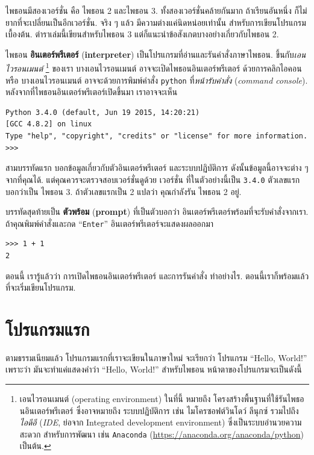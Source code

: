 ไพธอนมีสองเวอร์ชั่น คือ ไพธอน 2 และไพธอน 3.
ทั้งสองเวอร์ชั่นคล้ายกันมาก ถ้าเรียนอันหนึ่ง ก็ไม่ยากที่จะเปลี่ยนเป็นอีกเวอร์ชั่น.
จริง ๆ แล้ว มีความต่างแค่นิดหน่อยเท่านั้น สำหรับการเขียนโปรแกรมเบื้องต้น.
ตำราเล่มนี้เขียนสำหรับไพธอน 3 แต่ก็แนะนำข้อสังเกตบางอย่างเกี่ยวกับไพธอน 2.

ไพธอน \textbf{อินเตอร์พรีเตอร์} (\textbf{interpreter}) เป็นโปรแกรมที่อ่านและรันคำสั่งภาษาไพธอน.
ขึ้นกับ\textit{เอนไวรอนเมนต์}%
\footnote{เอนไวรอนเมนต์ (operating environment) ในที่นี้ หมายถึง โครงสร้างพื้นฐานที่ใช้รันไพธอนอินเตอร์พรีเตอร์
ซึ่งอาจหมายถึง 
ระบบปฏิบัติการ เช่น ไมโครซอฟต์วินโดว์ ลีนุกซ์ รวมไปถึง \textit{ไอดีอี} (\textit{IDE}, ย่อจาก Integrated development environment) ซึ่งเป็นระบบอำนวยความสะดวก สำหรับการพัฒนา เช่น \texttt{Anaconda} (\url{https://anaconda.org/anaconda/python}) เป็นต้น.}
ของเรา บางเอนไวรอนเมนต์ อาจจะเปิดไพธอนอินเตอร์พรีเตอร์
ด้วยการคลิกไอคอน
หรือ บางเอนไวรอนเมนต์ อาจจะด้วยการพิมพ์คำสั่ง \texttt{python} ที่\textit{หน้ารับคำสั่ง} (\textit{command console}).
หลังจากที่ไพธอนอินเตอร์พรีเตอร์เปิดขึ้นมา เราอาจจะเห็น

\begin{Verbatim}[fontsize=\small]
Python 3.4.0 (default, Jun 19 2015, 14:20:21) 
[GCC 4.8.2] on linux
Type "help", "copyright", "credits" or "license" for more information.
>>> 
\end{Verbatim}

สามบรรทัดแรก บอกข้อมูลเกี่ยวกับตัวอินเตอร์พรีเตอร์ และระบบปฏิบัติการ
ดังนั้นข้อมูลนี้อาจจะต่าง ๆ จากที่คุณได้.
แต่คุณควรจะตรวจสอบเวอร์ชั่นดูด้วย
เวอร์ชั่น ที่ในตัวอย่างนี้เป็น \texttt{3.4.0} ตัวเลขแรกบอกว่าเป็น ไพธอน 3.
ถ้าตัวเลขแรกเป็น 2 แปลว่า คุณกำลังรัน ไพธอน 2 อยู่.

บรรทัดสุดท้ายเป็น \textbf{ตัวพร้อม} (\textbf{prompt}) ที่เป็นตัวบอกว่า อินเตอร์พรีเตอร์พร้อมที่จะรับคำสั่งจากเรา.
ถ้าคุณพิมพ์คำสั่งและกด ``\texttt{Enter}'' อินเตอร์พรีเตอร์จะแสดงผลออกมา

\begin{verbatim}
>>> 1 + 1
2
\end{verbatim}
%
ตอนนี้ เรารู้แล้วว่า การเปิดไพธอนอินเตอร์พรีเตอร์ และการรันคำสั่ง ทำอย่างไร.
ตอนนี้เราก็พร้อมแล้วที่จะเริ่มเขียนโปรแกรม.

\section{โปรแกรมแรก}
\label{hello}

ตามธรรมเนียมแล้ว โปรแกรมแรกที่เราจะเขียนในภาษาใหม่ จะเรียกว่า โปรแกรม ``Hello, World!''
เพราะว่า มันจะทำแค่แสดงคำว่า ``Hello, World!''
สำหรับไพธอน หน้าตาของโปรแกรมจะเป็นดังนี้


